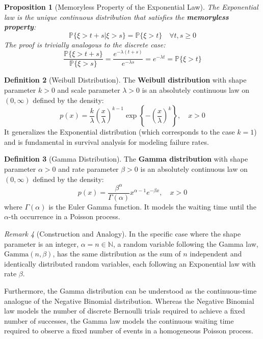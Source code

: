 \documentclass[12pt, openany]{book}
\theoremstyle{definition}
\newtheorem{definition}{Definition}[section]
\theoremstyle{plain}
\newtheorem{proposition}[definition]{Proposition}
\theoremstyle{remark}
\newtheorem{remark}[definition]{Remark}
\newcommand{\probP}{\mathbb{P}}
\begin{document}
\begin{proposition}[Memoryless Property of the Exponential Law]
The Exponential law is the unique continuous distribution that satisfies the \textbf{memoryless property}:
$$ \probP\{\xi > t+s | \xi > s\} = \probP\{\xi > t\} \quad \forall t, s \ge 0 $$
The proof is trivially analogous to the discrete case:
$$ \frac{\probP\{\xi > t+s\}}{\probP\{\xi > s\}} = \frac{e^{-\lambda(t+s)}}{e^{-\lambda s}} = e^{-\lambda t} = \probP\{\xi > t\} $$
\end{proposition}

\begin{definition}[Weibull Distribution]
The \textbf{Weibull distribution} with shape parameter $k>0$ and scale parameter $\lambda>0$ is an absolutely continuous law on $(0, \infty)$ defined by the density:
$$ p(x) = \frac{k}{\lambda}\left(\frac{x}{\lambda}\right)^{k-1} \exp\left\{-\left(\frac{x}{\lambda}\right)^k\right\}, \quad x > 0 $$
It generalizes the Exponential distribution (which corresponds to the case $k=1$) and is fundamental in survival analysis for modeling failure rates.
\end{definition}

\begin{definition}[Gamma Distribution]
The \textbf{Gamma distribution} with shape parameter $\alpha > 0$ and rate parameter $\beta > 0$ is an absolutely continuous law on $(0, \infty)$ defined by the density:
$$ p(x) = \frac{\beta^\alpha}{\Gamma(\alpha)} x^{\alpha-1} e^{-\beta x}, \quad x > 0 $$
where $\Gamma(\alpha)$ is the Euler Gamma function. It models the waiting time until the $\alpha$-th occurrence in a Poisson process.
\end{definition}

\begin{remark}[Construction and Analogy]
In the specific case where the shape parameter is an integer, $\alpha = n \in \mathbb{N}$, a random variable following the Gamma law, $\text{Gamma}(n, \beta)$, has the same distribution as the sum of $n$ independent and identically distributed random variables, each following an Exponential law with rate $\beta$.

Furthermore, the Gamma distribution can be understood as the continuous-time analogue of the Negative Binomial distribution. Whereas the Negative Binomial law models the number of discrete Bernoulli trials required to achieve a fixed number of successes, the Gamma law models the continuous waiting time required to observe a fixed number of events in a homogeneous Poisson process.
\end{remark}
\end{document}
